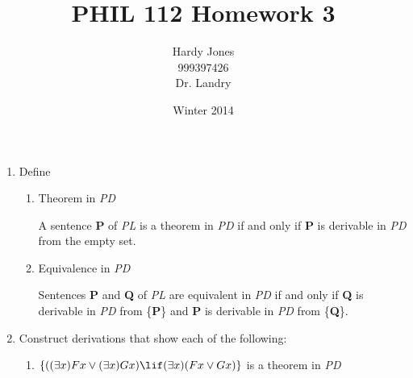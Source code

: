 \documentclass[12pt,letterpaper]{article}
\title{PHIL 112 Homework 3\vspace{-2ex}}
\author{Hardy Jones\\
        999397426\\
        Dr. Landry\vspace{-2ex}}
\date{Winter 2014}
\begin{document}
  \maketitle

  \begin{enumerate}
    \item Define
      \begin{enumerate}
        \item Theorem in \textit{PD}

          A sentence \textbf{P} of \textit{PL} is a theorem in \textit{PD} if and only if
          \textbf{P} is derivable in \textit{PD} from the empty set.

        \item Equivalence in \textit{PD}

          Sentences \textbf{P} and \textbf{Q} of \textit{PL} are equivalent in \textit{PD} if and only if
          \textbf{Q} is derivable in \textit{PD} from \{\textbf{P}\} and
          \textbf{P} is derivable in \textit{PD} from \{\textbf{Q}\}.
      \end{enumerate}

    \item Construct derivations that show each of the following:
      \begin{enumerate}
        \item
          $\{((\exists x)Fx \lor (\exists x)Gx) \lif (\exists x)(Fx \lor Gx)\}$ is a theorem in \textit{PD}

      \end{enumerate}


\end{enumerate}
\end{document}

